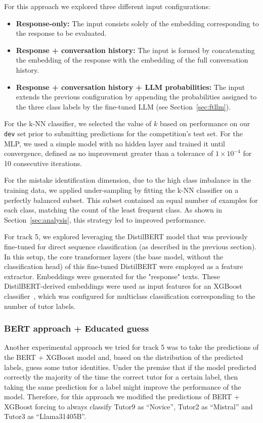 \documentclass[11pt]{article}
\begin{document}
For this approach we explored three different input configurations:
\begin{itemize}
    \setlength\itemsep{0em}
    \item\textbf{Response-only:} The input consists solely of the embedding corresponding to the response to be evaluated.
    \item\textbf{Response + conversation history:} The input is formed by concatenating the embedding of the response with the embedding of the full conversation history.
    \item\textbf{Response + conversation history + LLM probabilities:} The input extends the previous configuration by appending the probabilities assigned to the three class labels by the fine-tuned LLM (see Section~\ref{sec:ftllm}).
\end{itemize}

For the k-NN classifier, we selected the value of $k$ based on performance on our \texttt{dev} set prior to submitting predictions for the competition's test set. For the MLP, we used a simple model with no hidden layer and trained it until convergence, defined as no improvement greater than a tolerance of $1 \times 10^{-4}$ for 10 consecutive iterations.

For the mistake identification dimension, due to the high class imbalance in the training data, we applied under-sampling by fitting the k-NN classifier on a perfectly balanced subset.
This subset contained an equal number of examples for each class, matching the count of the least frequent class.
As shown in Section~\ref{sec:analysis}, this strategy led to improved performance.

For track 5, we explored leveraging the DistilBERT model that was previously fine-tuned for direct sequence classification (as described in the previous section). In this setup, the core transformer layers (the base model, without the classification head) of this fine-tuned DistilBERT were employed as a feature extractor. Embeddings were generated for the "response" texts. These DistilBERT-derived embeddings were used as input features for an XGBoost classifier~\cite{chen2016xgboost}, which was configured for multiclass classification corresponding to the number of tutor labels. 

\subsubsection{BERT approach + Educated guess}
Another experimental approach we tried for track 5 was to take the predictions of the BERT + XGBoost model and, based on the distribution of the predicted labels, guess some tutor identities. Under the premise that if the model predicted correctly the majority of the time the correct tutor for a certain label, then taking the same prediction for a label might improve the performance of the model. 
Therefore, for this approach we modified the predictions of BERT + XGBoost forcing to always classify Tutor9 as ``Novice'', Tutor2 as ``Mistral'' and Tutor3 as ``Llama31405B''.
\end{document}
